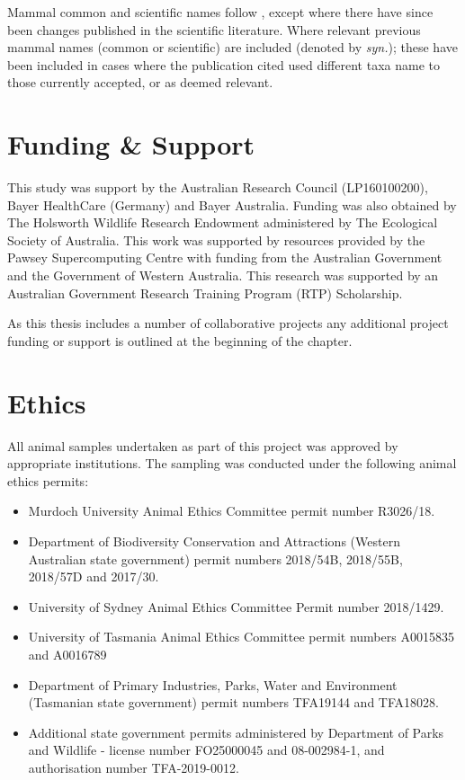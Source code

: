 \documentclass[a4paper, nobind]{templates/ociamthesis}
\providecommand{\tightlist}{%
  \setlength{\itemsep}{0pt}\setlength{\parskip}{0pt}}
\begin{document}
Mammal common and scientific names follow \textcite{jacksonTaxonomyAustralianMammals2015}, except where there have since been changes published in the scientific literature.
Where relevant previous mammal names (common or scientific) are included (denoted by \emph{syn.}); these have been included in cases where the publication cited used different taxa name to those currently accepted, or as deemed relevant.

\hypertarget{funding-support}{%
\section*{Funding \& Support}\label{funding-support}}

This study was support by the Australian Research Council (LP160100200), Bayer HealthCare (Germany) and Bayer Australia.
Funding was also obtained by The Holsworth Wildlife Research Endowment administered by The Ecological Society of Australia.
This work was supported by resources provided by the Pawsey Supercomputing Centre with funding from the Australian Government and the Government of Western Australia.
This research was supported by an Australian Government Research Training Program (RTP) Scholarship.

As this thesis includes a number of collaborative projects any additional project funding or support is outlined at the beginning of the chapter.

\hypertarget{ethics}{%
\section*{Ethics}\label{ethics}}

All animal samples undertaken as part of this project was approved by appropriate institutions. The sampling was conducted under the following animal ethics permits:

\begin{itemize}
\tightlist
\item
  Murdoch University Animal Ethics Committee permit number R3026/18.
\item
  Department of Biodiversity Conservation and Attractions (Western Australian state government) permit numbers 2018/54B, 2018/55B, 2018/57D and 2017/30.
\item
  University of Sydney Animal Ethics Committee Permit number 2018/1429.
\item
  University of Tasmania Animal Ethics Committee permit numbers A0015835 and A0016789
\item
  Department of Primary Industries, Parks, Water and Environment (Tasmanian state government) permit numbers TFA19144 and TFA18028.
\item
  Additional state government permits administered by Department of Parks and Wildlife - license number FO25000045 and 08-002984-1, and authorisation number TFA-2019-0012.
\end{itemize}
\end{document}
